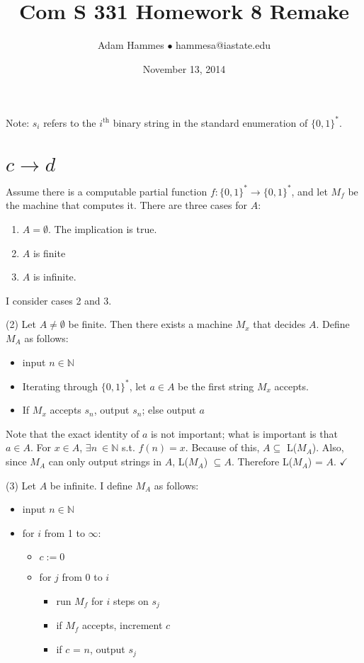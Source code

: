 \documentclass[11pt]{article}
\let\imp\rightarrow
\begin{document}
\title{Com S 331 Homework 8 Remake}
\author{Adam Hammes $\bullet$ hammesa@iastate.edu}
\date{November 13, 2014}
\maketitle

Note: $s_i$ refers to the $i^{\text{th}}$ binary string in the standard enumeration of $\{0,1\}^*$.

\section*{$c \imp d$}

Assume there is a computable partial function $f: \{0,1\}^* \imp \{0,1\}^*$, and let $M_f$ be the machine that computes it.
There are three cases for $A$:
\begin{enumerate}
	\item $A = \emptyset$. The implication is true.
	\item $A$ is finite
	\item $A$ is infinite.
\end{enumerate}

I consider cases 2 and 3.

(2) Let $A \neq \emptyset$ be finite. 
Then there exists a machine $M_x$ that decides $A$.
Define $M_A$ as follows:
\begin{itemize}
	\item input $n \in \mathbb{N}$
	\item Iterating through $\{0,1\}^*$, let $a \in A$ be the first string $M_x$ accepts.
	\item If $M_x$ accepts $s_n$, output $s_n$; else output $a$
\end{itemize}

Note that the exact identity of $a$ is not important; what is important is that $a \in A$.
For $x \in A$, $\exists n\ \in \mathbb{N}$ s.t. $f(n) = x$.
Because of this, $A \subseteq $ L($M_A$).
Also, since $M_A$ can only output strings in $A$, L($M_A$) $\subseteq A$.
Therefore L($M_A$) = $A$. $\checkmark$

(3) Let $A$ be infinite.
I define $M_A$ as follows:
\begin{itemize}
	\item input $n \in \mathbb{N}$
	\item for $i$ from 1 to $\infty$:
	\begin{itemize}
		\item $c := 0$
		\item for $j$ from 0 to $i$
		\begin{itemize}
			\item run $M_f$ for $i$ steps on $s_j$
			\item if $M_f$ accepts, increment $c$
			\item if $c$ = $n$, output $s_j$
		\end{itemize}
	\end{itemize}
\end{itemize}
\end{document}
